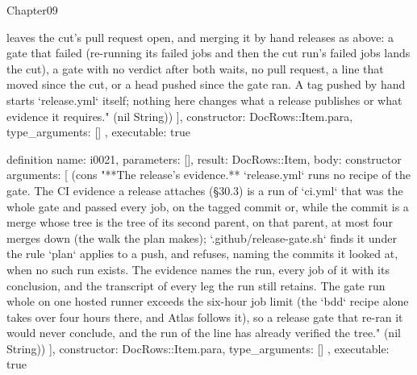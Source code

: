 \begin{lexlean}{Chapter09}
\begin{semanticmodule}
{{leaves the cut's pull request open, and merging it by hand releases as above: a gate that failed (re-running its failed jobs and then the cut run's failed jobs lands the cut), a gate with no verdict after both waits, no pull request, a line that moved since the cut, or a head pushed since the gate ran. A tag pushed by hand starts `release.yml` itself; nothing here changes what a release publishes or what evidence it requires." (nil String))
    ],
    constructor: DocRows::Item.para,
    type_arguments: []
  },
  executable: true
}

definition{
  name: i0021,
  parameters: [],
  result: DocRows::Item,
  body: constructor{
    arguments: [
      (cons "**The release's evidence.** `release.yml` runs no recipe of the gate. The CI evidence a release attaches (§30.3) is a run of `ci.yml` that was the whole gate and passed every job, on the tagged commit or, while the commit is a merge whose tree is the tree of its second parent, on that parent, at most four merges down (the walk the plan makes); `.github/release-gate.sh` finds it under the rule `plan` applies to a push, and refuses, naming the commits it looked at, when no such run exists. The evidence names the run, every job of it with its conclusion, and the transcript of every leg the run still retains. The gate run whole on one hosted runner exceeds the six-hour job limit (the `bdd` recipe alone takes over four hours there, and Atlas follows it), so a release gate that re-ran it would never conclude, and the run of the line has already verified the tree." (nil String))
    ],
    constructor: DocRows::Item.para,
    type_arguments: []
  },
  executable: true
}


\end{semanticmodule}
\end{lexlean}
